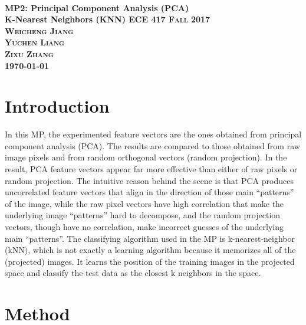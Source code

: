 \documentclass{article}
\begin{document}
	\everymath{\displaystyle}
	\begin{titlepage}	 	
		\center
		\text{}\\[3cm]
		\linespread{2}\huge \bfseries MP2: Principal Component Analysis (PCA)\\ K-Nearest Neighbors (KNN)
		\center\textsc{\Large ECE 417 Fall 2017}\\[1cm]
		\Large\center\textsc{Weicheng Jiang \\Yuchen Liang\\ Zixu Zhang  }\\[1.5cm]
		\Large \today\\
		\vfill
	\end{titlepage}
	\setlength{\baselineskip}{24pt}
	
	\section{Introduction}
	
	In this MP, the experimented feature vectors are the ones obtained from principal component analysis (PCA). The results are compared to those obtained from raw image pixels and from random orthogonal vectors (random projection). In the result, PCA feature vectors appear far more effective than either of raw pixels or random projection. The intuitive reason behind the scene is that PCA produces uncorrelated feature vectors that align in the direction of those main “patterns” of the image, while the raw pixel vectors have high correlation that make the underlying image “patterns” hard to decompose, and the random projection vectors, though have no correlation, make incorrect guesses of the underlying main “patterns”. The classifying algorithm used in the MP is k-nearest-neighbor (kNN), which is not exactly a learning algorithm because it memorizes all of the (projected) images. It learns the position of the training images in the projected space and classify the test data as the closest k neighbors in the space.
	
	\section{Method}
\end{document}
